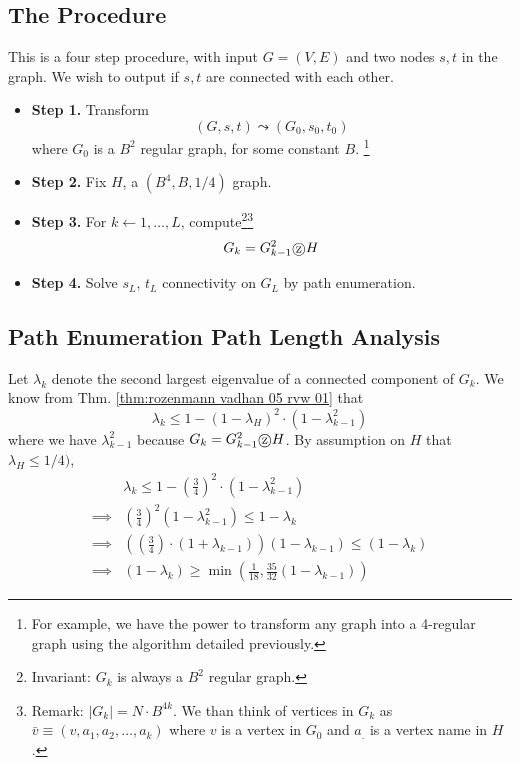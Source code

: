 \documentclass[11pt, letter]{book}
\newcommand*\tcircle[1]{%
  \raisebox{-0.5pt}{%
    \textcircled{#1}%
  }%
}
\begin{document}
\subsection{The Procedure}
\begin{algorithm}
This is a four step procedure, with input $G = (V, E)$ and two nodes $s, t$ in the graph. We wish to output if $s, t$ are connected with each other. 

\begin{itemize}
	\item \textbf{Step 1.} Transform 
		\begin{equation}
			(G, s, t) \leadsto (G_0, s_0, t_0)
		\end{equation}
		where $G_0$ is a $B^2$ regular graph, for some constant $B$. \footnote{For example, we have the power to transform any graph into a 4-regular graph using the algorithm detailed previously.}
	\item \textbf{Step 2.} Fix $H$, a $(B^4, B, 1/4)$ graph. 
	\item \textbf{Step 3.} For $k \gets 1, \dots, L$, compute\footnote{Invariant: $G_k$ is always a $B^2$ regular graph. }\footnote{Remark: $|G_k| = N \cdot B^{4k}$. We than think of vertices in $G_k$ as $\bar v \equiv (v, a_1, a_2, \dots, a_k)$ where $v$ is a vertex in $G_0$ and $a_.$ is a vertex name in $H$. }
		\begin{equation}
			G_k = G_{k - 1}^2 \tcircle{z} H
		\end{equation}
	\item \textbf{Step 4.} Solve $s_{L}$, $t_{L}$ connectivity on $G_L$ by path enumeration.  
\end{itemize}	
\end{algorithm}

\subsection{Path Enumeration Path Length Analysis}
Let $\lambda_k$ denote the second largest eigenvalue of a connected component of $G_k$. We know from Thm. \ref{thm:rozenmann vadhan 05 rvw 01} that 
\begin{equation}
	\lambda_k \leq 1 - (1 - \lambda_H) ^ 2 \cdot ( 1- \lambda_{k - 1} ^2 ) 
\end{equation}
where we have $\lambda_{k - 1} ^2$ because $G_k = G_{k - 1}^2 \tcircle{z} H$. By assumption on $H$ that $\lambda_H \leq 1/4)$, 
\begin{align}
	&\lambda_k \leq 1 - \left( \frac{3}{4} \right) ^ 2 \cdot (1 - \lambda_{k - 1}^2 ) \\
	\implies & \left( \frac{3}{4} \right) ^ 2 ( 1 - \lambda_{k - 1}^2 ) \leq 1 - \lambda_k \\
	\implies & \left( \left ( \frac{3}{4} \right) \cdot ( 1 + \lambda_{k - 1} ) \right) ( 1 - \lambda_{k - 1} )  \leq (1 - \lambda_k) \\
	\implies & (1 - \lambda_k) \geq \min \left( \frac{1}{18}, \frac{35}{32} ( 1 - \lambda_{k - 1} ) \right )
\end{align}
\end{document}
